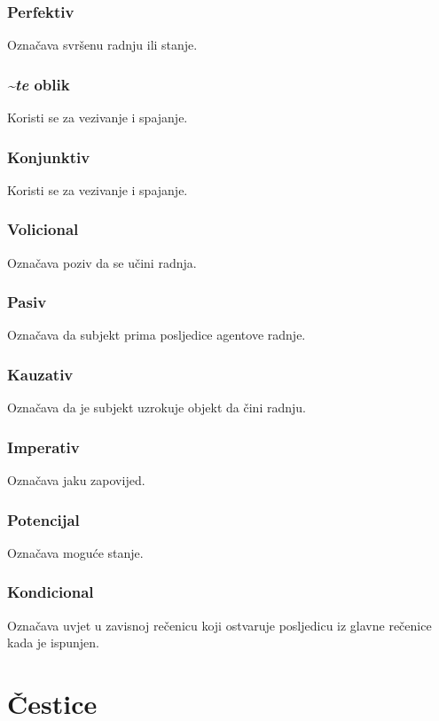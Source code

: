 \documentclass[a4paper, 12pt]{amsart}
\begin{document}
  \subsubsection*{Perfektiv}
  Označava svršenu radnju ili stanje.

  \subsubsection*{\textit{\textasciitilde{}te} oblik}
  Koristi se za vezivanje i spajanje.

  \subsubsection*{Konjunktiv}
  Koristi se za vezivanje i spajanje.

  \subsubsection*{Volicional}
  Označava poziv da se učini radnja.

  \subsubsection*{Pasiv}
  Označava da subjekt prima posljedice agentove radnje.

  \subsubsection*{Kauzativ}
  Označava da je subjekt uzrokuje objekt da čini radnju.

  \subsubsection*{Imperativ}
  Označava jaku zapovijed.

  \subsubsection*{Potencijal}
  Označava moguće stanje.

  \subsubsection*{Kondicional}
  Označava uvjet u zavisnoj rečenicu koji ostvaruje posljedicu iz glavne rečenice kada je ispunjen.

  \section{Čestice}
\end{document}

